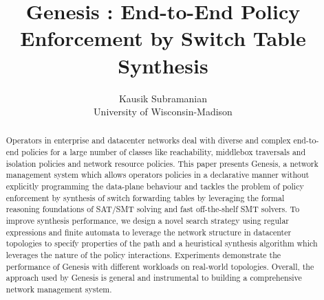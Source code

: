 \documentclass[letterpaper,twocolumn,10pt]{sig-alternate-10pt}
\title{Genesis : End-to-End Policy Enforcement by Switch Table Synthesis }
\author{Kausik Subramanian \\
	University of Wisconsin-Madison}
\begin{document}
\maketitle

\begin{abstract}
Operators in enterprise and datacenter networks deal with diverse and complex end-to-end policies for a large number of classes like reachability, middlebox traversals and isolation policies and network resource policies. This paper presents Genesis, a network management system which allows operators policies in a declarative manner without explicitly programming the data-plane behaviour and tackles the problem of policy enforcement by synthesis of switch forwarding tables by leveraging the formal reasoning foundations of SAT/SMT solving and fast off-the-shelf SMT solvers. To improve synthesis performance, we design a novel search strategy using regular expressions and finite automata to leverage the network structure in datacenter topologies to specify properties of the path and a heuristical synthesis algorithm which leverages the nature of the policy interactions. Experiments demonstrate the performance of Genesis with different workloads on real-world topologies. Overall, the approach used by Genesis is general and instrumental to building a comprehensive network management system. 

\end{abstract}











{}


\end{document}
